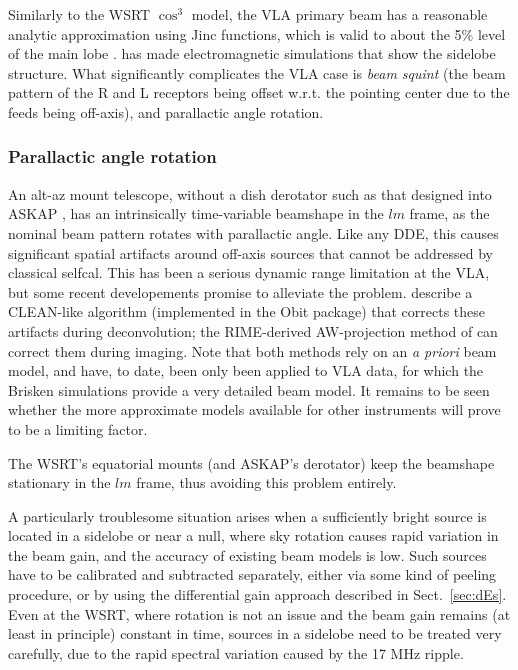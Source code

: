 \documentclass[referee]{aa}
\begin{document}
Similarly to the WSRT $\cos^3$ model, the VLA primary beam has a reasonable analytic approximation using Jinc functions, which is valid to about the 5\% level of the main lobe \citep{Uson-Cotton:VLA-beam}. \citet{Brisken:VLA-beam} has made electromagnetic simulations that show the sidelobe structure. What significantly complicates the VLA case is {\em beam squint} (the beam pattern of the R and L receptors being offset w.r.t. the pointing center due to the feeds being off-axis), and parallactic angle rotation.

\subsubsection{Parallactic angle rotation}

An alt-az mount telescope, without a dish derotator such as that designed into ASKAP \citep{ASKAP}, has an intrinsically time-variable beamshape in the $lm$ frame, as the nominal beam pattern rotates with parallactic angle. Like any DDE, this causes significant spatial artifacts around off-axis sources that cannot be addressed by classical selfcal. This has been a serious dynamic range limitation at the VLA, but some recent developements promise to alleviate the problem. \citet{Uson-Cotton:VLA-beam} describe a CLEAN-like algorithm (implemented in the Obit package) that corrects these artifacts during deconvolution; the RIME-derived AW-projection method of \citet{SB:imageplane} can correct them during imaging. Note that both methods rely on an \emph{a priori} beam model, and have, to date, been only been applied to VLA data, for which the Brisken simulations provide a very detailed beam model. It remains to be seen whether the more approximate models available for other instruments will prove to be a limiting factor.

The WSRT's equatorial mounts (and ASKAP's derotator) keep the beamshape stationary in the $lm$ frame, thus avoiding this problem entirely.

A particularly troublesome situation arises when a sufficiently bright source is located in a sidelobe or near a null, where sky rotation causes rapid variation in the beam gain, and the accuracy of existing beam models is low. Such sources have to be calibrated and subtracted separately, either via some kind of peeling procedure, or by using the differential gain approach described in Sect.~\ref{sec:dEs}. Even at the WSRT, where rotation is not an issue and the beam gain remains (at least in principle) constant in time, sources in a sidelobe need to be treated very carefully, due to the rapid spectral variation caused by the 17 MHz ripple.
\end{document}
